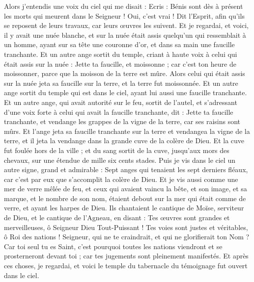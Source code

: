 \begin{multicols}{2}
Alors j'entendis une voix du ciel qui me disait : Ecris : Bénis sont dès à présent les morts qui meurent dans le Seigneur ! Oui, c'est vrai ! Dit l'Esprit, afin qu'ils se reposent de leurs travaux, car leurs œuvres les suivent.
Et je regardai, et voici, il y avait une nuée blanche, et sur la nuée était assis quelqu'un qui ressemblait à un homme, ayant sur sa tête une couronne d'or, et dans sa main une faucille tranchante.
Et un autre ange sortit du temple, criant à haute voix à celui qui était assis sur la nuée : Jette ta faucille, et moissonne ; car c'est ton heure de moissonner, parce que la moisson de la terre est mûre.
Alors celui qui était assis sur la nuée jeta sa faucille sur la terre, et la terre fut moissonnée.
Et un autre ange sortit du temple qui est dans le ciel, ayant lui aussi une faucille tranchante.
Et un autre ange, qui avait autorité sur le feu, sortit de l'autel, et s'adressant d'une voix forte à celui qui avait la faucille tranchante, dit : Jette ta faucille tranchante, et vendange les grappes de la vigne de la terre, car ses raisins sont mûrs.
Et l'ange jeta sa faucille tranchante sur la terre et vendangea la vigne de la terre, et il jeta la vendange dans la grande cuve de la colère de Dieu.
Et la cuve fut foulée hors de la ville ; et du sang sortit de la cuve, jusqu'aux mors des chevaux, sur une étendue de mille six cents stades.
\VerseOne{}Puis je vis dans le ciel un autre signe, grand et admirable : Sept anges qui tenaient les sept derniers fléaux, car c'est par eux que s'accomplit la colère de Dieu.
Et je vis aussi comme une mer de verre mêlée de feu, et ceux qui avaient vaincu la bête, et son image, et sa marque, et le nombre de son nom, étaient debout sur la mer qui était comme de verre, et ayant les harpes de Dieu.
Ils chantaient le cantique de Moïse, serviteur de Dieu, et le cantique de l'Agneau, en disant : Tes œuvres sont grandes et merveilleuses, ô Seigneur Dieu Tout-Puissant ! Tes voies sont justes et véritables, ô Roi des nations !
Seigneur, qui ne te craindrait, et qui ne glorifierait ton Nom ? Car toi seul tu es Saint, c'est pourquoi toutes les nations viendront et se prosterneront devant toi ; car tes jugements sont pleinement manifestés.
Et après ces choses, je regardai, et voici le temple du tabernacle du témoignage fut ouvert dans le ciel.

\end{multicols}
